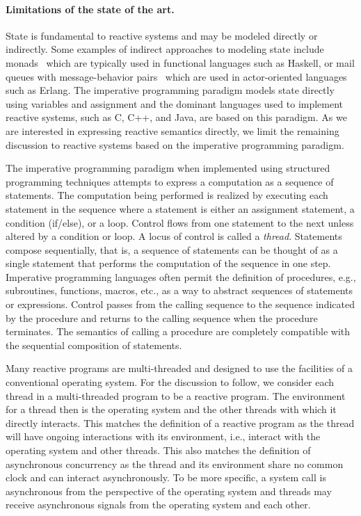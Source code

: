 \paragraph{Limitations of the state of the art.}
State is fundamental to reactive systems and may be modeled directly or indirectly.
Some examples of indirect approaches to modeling state include monads~\cite{wadler1990comprehending} which are typically used in functional languages such as Haskell, or mail queues with message-behavior pairs~\cite{agha1985actors} which are used in actor-oriented languages such as Erlang.
The imperative programming paradigm models state directly using variables and assignment and the dominant languages used to implement reactive systems, such as C, C++, and Java, are based on this paradigm.
As we are interested in expressing reactive semantics directly, we limit the remaining discussion to reactive systems based on the imperative programming paradigm.

The imperative programming paradigm when implemented using structured programming techniques attempts to express a computation as a sequence of statements.
The computation being performed is realized by executing each statement in the sequence where a statement is either an assignment statement, a condition (if/else), or a loop.
Control flows from one statement to the next unless altered by a condition or loop.
A locus of control is called a \emph{thread}.
Statements compose sequentially, that is, a sequence of statements can be thought of as a single statement that performs the computation of the sequence in one step.
Imperative programming languages often permit the definition of procedures, e.g., subroutines, functions, macros, etc., as a way to abstract sequences of statements or expressions.
Control passes from the calling sequence to the sequence indicated by the procedure and returns to the calling sequence when the procedure terminates.
The semantics of calling a procedure are completely compatible with the sequential composition of statements.

Many reactive programs are multi-threaded and designed to use the facilities of a conventional operating system.
For the discussion to follow, we consider each thread in a multi-threaded program to be a reactive program.
The environment for a thread then is the operating system and the other threads with which it directly interacts.
This matches the definition of a reactive program as the thread will have ongoing interactions with its environment, i.e., interact with the operating system and other threads.
This also matches the definition of asynchronous concurrency as the thread and its environment share no common clock and can interact asynchronously.
To be more specific, a system call is asynchronous from the perspective of the operating system and threads may receive asynchronous signals from the operating system and each other.

